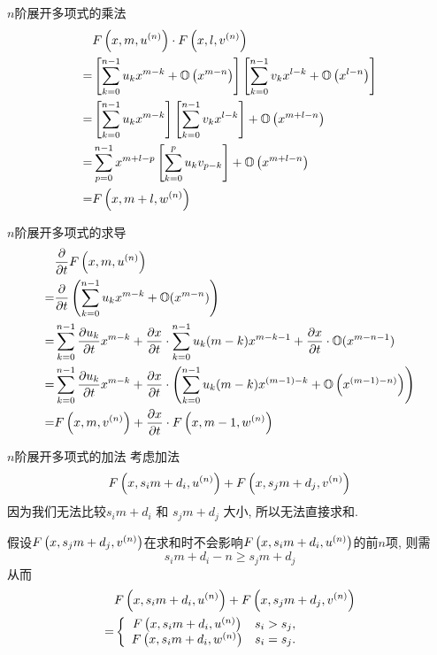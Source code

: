 
\begin{frame}{$n$阶展开多项式的乘法}
\[
\begin{aligned}
& F\left(x,m,u ^{(n)}\right)\cdot F\left(x,l,v^{(n)}\right) \\
=& \left[\sum_{k=0}^{n-1}{u_k x^{m-k}}+\mathbb O\left(x^{m-n}\right)\right]\left[\sum_{k=0}^{n-1}{v_k x^{l-k}}+\mathbb O\left(x^{l-n}\right)\right] \\
=& \left[\sum_{k=0}^{n-1}{u_k x^{m-k}}\right]\left[\sum_{k=0}^{n-1}{v_k x^{l-k}}\right]+\mathbb O\left(x^{m+l-n}\right) \\
=& \sum_{p=0}^{n-1}{x^{m+l-p}\left[\sum_{k=0}^p{u_k v_{p-k}}\right]}+\mathbb O\left(x^{m+l-n}\right) \\
=& F\left(x,m+l,w^{(n)}\right) 
\end{aligned} 
\]
\end{frame}

\begin{frame}{$n$阶展开多项式的求导}
\[
\begin{aligned}
& \frac{\partial}{\partial t}F\left(x,m,u^{(n)}\right)  \\
=& \frac{\partial}{\partial t}\left(\sum_{k=0}^{n-1}{u_k x^{m-k}}+\mathbb O(x^{m-n})\right) \\
=& \sum_{k=0}^{n-1}{\frac{\partial u_k}{\partial t}x^{m-k}}+\frac{\partial x}{\partial t}\cdot\sum_{k=0}^{n-1}{u_k (m-k) x^{m-k-1}}+\frac{\partial x}{\partial t}\cdot\mathbb O(x^{m-n-1}) \\
=& \sum_{k=0}^{n-1}{\frac{\partial u_k}{\partial t}x^{m-k}}+\frac{\partial x}{\partial t}\cdot\left(\sum_{k=0}^{n-1}{u_k (m-k) x^{(m-1)-k}}+\mathbb O\left(x^{(m-1)-n)}\right)\right) \\ 
=& F\left(x,m,v^{(n)}\right)+\frac{\partial x}{\partial t}\cdot F\left(x,m-1,w^{(n)}\right) 
\end{aligned}
\]
\end{frame}


\begin{frame}{$n$阶展开多项式的加法}
考虑加法 
\[
    F\left(x,s_i m+d_i,u^{(n)}\right)+F\left(x,s_j m+d_j,v^{(n)}\right)
\]  
因为我们无法比较$s_i m + d_i$ 和 $s_j m + d_j$ 大小, 所以无法直接求和. 

假设$F\left(x,s_j m+d_j,v^{(n)}\right)$在求和时不会影响$F\left(x,s_i m+d_i,u^{(n)}\right)$的前$n$项, 则需 
\[
    s_i m+d_i - n \ge s_j m+d_j 
\]
从而 
\[
\begin{aligned}
&F\left(x,s_i m+d_i,u^{(n)}\right)+F\left(x,s_j m+d_j,v^{(n)}\right) \\
=&\left\{
\begin{array}{cl}
    F\left(x,s_i m+d_i,u^{(n)}\right) & s_i>s_j,            \\
    F\left(x,s_i m+d_i,w^{(n)}\right) & s_i=s_j.
\end{array}
\right.
\end{aligned}
\]
\end{frame}

